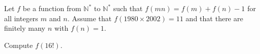 Let $f$ be a function from $\mathbb{N}^*$ to $\mathbb{N}^*$ such that $f(mn) = f(m) + f(n) - 1$ for all integers $m$ and $n$. Assume that $f(1980 \times 2002) = 11$ and that there are finitely many $n$ with $f(n) = 1$.

Compute $f(16!)$.
